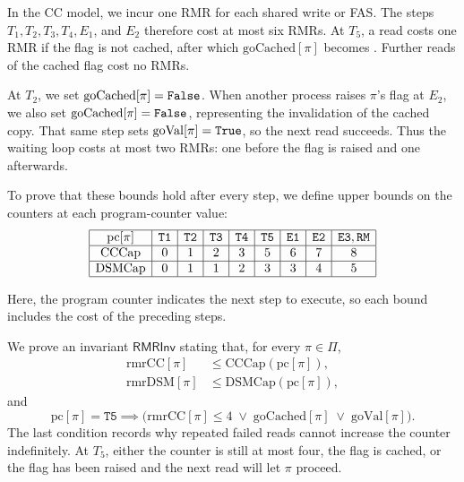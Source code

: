 \documentclass[12pt]{amsproc}
\begin{document}
In the CC model, we incur one RMR for each shared write or FAS. The steps $T_1,T_2,T_3,T_4,E_1$, and $E_2$ therefore cost at most six RMRs. At $T_5$, a read costs one RMR if the flag is not cached, after which $\mathrm{goCached}[\pi]$ becomes \True. Further reads of the cached flag cost no RMRs.

At $T_2$, we set $\mathrm{goCached}[\pi]=\texttt{False}$. When another process raises $\pi$'s flag at $E_2$, we also set $\mathrm{goCached}[\pi]=\texttt{False}$, representing the invalidation of the cached copy. That same step sets $\mathrm{goVal}[\pi]=\texttt{True}$, so the next read succeeds. Thus the waiting loop costs at most two RMRs: one before the flag is raised and one afterwards.

To prove that these bounds hold after every step, we define upper bounds on the counters at each program-counter value:
\begingroup
\renewcommand{\arraystretch}{1.5}
\[
\begin{array}{|c|c|c|c|c|c|c|c|c|}
\hline
\mathrm{pc}[\pi]
    & \texttt{T1} & \texttt{T2} & \texttt{T3} & \texttt{T4}
    & \texttt{T5} & \texttt{E1} & \texttt{E2}
    & \texttt{E3},\texttt{RM} \\ \hline
\mathrm{CCCap}
    & 0 & 1 & 2 & 3 & 5 & 6 & 7 & 8 \\ \hline
\mathrm{DSMCap}
    & 0 & 1 & 1 & 2 & 3 & 3 & 4 & 5 \\ \hline
\end{array}
\]
\endgroup

Here, the program counter indicates the next step to execute, so each bound includes the cost of the preceding steps.

We prove an invariant $\mathsf{RMRInv}$ stating that, for every
$\pi\in\Pi$,
\begin{align*}
\mathrm{rmrCC}[\pi]
    &\le \mathrm{CCCap}(\mathrm{pc}[\pi]), \\
\mathrm{rmrDSM}[\pi]
    &\le \mathrm{DSMCap}(\mathrm{pc}[\pi]),
\end{align*}
and
\[
\mathrm{pc}[\pi]=\texttt{T5}
\implies
\bigl(
    \mathrm{rmrCC}[\pi]\le 4
    \;\lor\; \mathrm{goCached}[\pi]
    \;\lor\; \mathrm{goVal}[\pi]
\bigr).
\]
The last condition records why repeated failed reads cannot increase the counter indefinitely. At $T_5$, either the counter is still at most four, the flag is cached, or the flag has been raised and the next read will let $\pi$ proceed.
\end{document}

